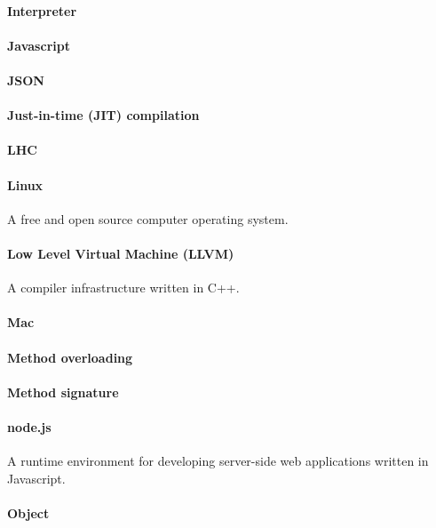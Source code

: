 \paragraph{Interpreter}
\paragraph{Javascript}
\paragraph{JSON}
\paragraph{Just-in-time (JIT) compilation}
\paragraph{LHC}
\paragraph{Linux}
A free and open source computer operating system.
\paragraph{Low Level Virtual Machine (LLVM)}
A compiler infrastructure written in C++.
\paragraph{Mac}

\paragraph{Method overloading}

\paragraph{Method signature}

\paragraph{node.js}
A runtime environment for developing server-side web applications written in Javascript. 

\paragraph{Object}

